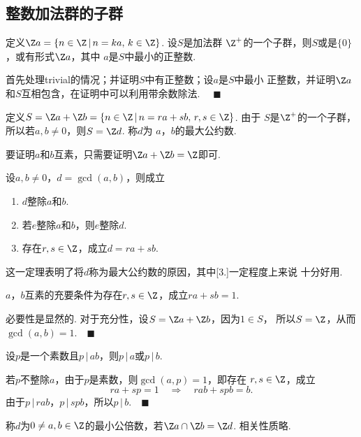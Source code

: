 \subsection{整数加法群的子群}

  \begin{thm}
    定义$\Z a=\{n\in\Z\,|\,n=ka,\,k\in\Z\}$. 设$S$是加法群
    $\Z^+$的一个子群，则$S$或是$\{0\}$，或有形式$\Z a$，其中
    $a$是$S$中最小的正整数.
  \end{thm}
  \proof
    首先处理trivial的情况；并证明$S$中有正整数；设$a$是$S$中最小
    正整数，并证明$\Z a$和$S$互相包含，在证明中可以利用带余数除法.
    $\quad\blacksquare$

  \begin{defi}[最大公约数]
    定义$S=\Z a+\Z b=\{n\in\Z\,|\,n=ra+sb,\,r,s\in\Z\}$. 由于
    $S$是$\Z^+$的一个子群，所以若$a,b\ne 0$，则$S=\Z d$. 称$d$为
    $a$，$b$的最大公约数.
  \end{defi}
  \remark
    要证明$a$和$b$互素，只需要证明$\Z a+\Z b = \Z$即可.

  \begin{thm}[最大公约数]
    设$a,b\ne 0$，$d=\gcd(a, b)$，则成立
    \begin{enumerate}
      \item $d$整除$a$和$b$.
      \item 若$e$整除$a$和$b$，则$e$整除$d$.
      \item 存在$r,s\in\Z$，成立$d=ra+sb$.
    \end{enumerate}
  \end{thm}
  \remark
    这一定理表明了将$d$称为最大公约数的原因，其中[3.]一定程度上来说
    十分好用.

  \begin{cor}[互素]
    $a$，$b$互素的充要条件为存在$r,s\in\Z$，成立$ra+sb=1$.
  \end{cor}
  \proof
    必要性是显然的. 对于充分性，设$S=\Z a+\Z b$，因为$1\in S$，
    所以$S=\Z$，从而$\gcd(a, b)=1$.$\quad\blacksquare$

  \begin{cor}
    设$p$是一个素数且$p\,|\,ab$，则$p\,|\,a$或$p\,|\,b$.
  \end{cor}
  \proof
    若$p$不整除$a$，由于$p$是素数，则$\gcd(a,p)=1$，即存在
    $r,s\in\Z$，成立
    \[
      ra+sp = 1 \quad\Rightarrow\quad rab+spb=b.
    \]
    由于$p\,|\,rab$，$p\,|\,spb$，所以$p\,|\,b$.$\quad\blacksquare$

  \begin{defi}[最小公倍数]
    称$d$为$0\ne a,b\in\Z$的最小公倍数，若$\Z a\cap\Z b=\Z d$.
    相关性质略.
  \end{defi}

